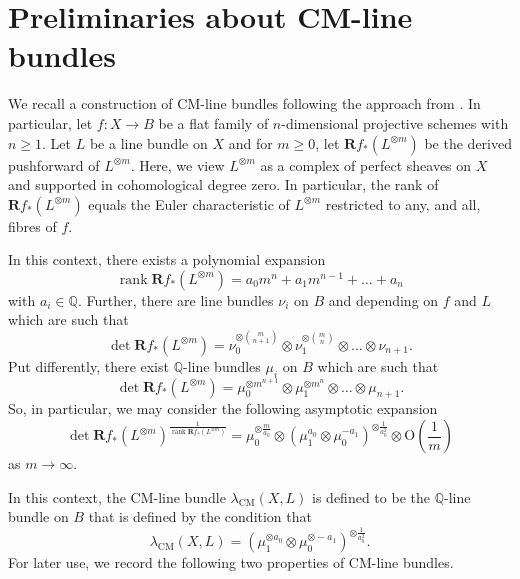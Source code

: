 \documentclass[12pt]{amsart}
\providecommand{\binom}[2]{{#1\choose#2}}
\renewcommand{\geq}{\geqslant}
\newcommand{\QQ}{\mathbb{Q}} %
\theoremstyle{definition}
\numberwithin{equation}{section}
\begin{document}
\section{Preliminaries about CM-line bundles}

We recall a construction of CM-line bundles following the approach from \cite{Arezzo:DellaVedova:LaNave}.  In particular, let $f \colon X \rightarrow B$ be a flat family of $n$-dimensional projective schemes with $n \geq 1$.  Let $L$ be a line bundle on $X$ and for $m \geq 0$, let $\mathbf{R}f_*(L^{\otimes m})$ be the derived pushforward of $L^{\otimes m}$.  Here, we view $L^{\otimes m}$ as a complex of perfect sheaves on $X$ and supported in cohomological degree zero.  In particular, the rank of $\mathbf{R}f_*(L^{\otimes m})$ equals the Euler characteristic of $L^{\otimes m}$ restricted to any, and all, fibres of $f$.

In this context, there exists a polynomial expansion
$$
\operatorname{rank} \mathbf{R}f_*(L^{\otimes m}) = a_0 m^n + a_1 m^{n-1} + \dots + a_n
$$
with $a_i \in \QQ$.  Further, there are line bundles $\nu_i$ on $B$ and depending on $f$ and $L$ which are such that 
$$
\operatorname{det} \mathbf{R}f_*(L^{\otimes m}) = \nu_0^{\otimes \binom{m}{n+1} } \otimes \nu_1^{\otimes \binom{m}{n}} \otimes \dots \otimes \nu_{n+1} \text{.}
$$
Put differently, there exist $\QQ$-line bundles $\mu_i$ on $B$ which are such that 
$$
\operatorname{det} \mathbf{R} f_*(L^{\otimes m}) = \mu_0^{\otimes m^{n+1}} \otimes \mu_1^{\otimes m^n} \otimes \dots \otimes \mu_{n+1} \text{.}
$$
So, in particular, we may consider the following asymptotic expansion
$$
\operatorname{det} \mathbf{R}f_* (L^{\otimes m})^{\frac{1}{\operatorname{rank} \mathbf{R} f_*(L^{\otimes m})}} = \mu_0^{\otimes \frac{m}{a_0}} \otimes (\mu_1^{a_0} \otimes \mu_0^{-a_1})^{\otimes \frac{1}{a_0^2}} \otimes \mathrm{O}\left(\frac{1}{m}\right) 
$$
as $m \to \infty$.

In this context, the CM-line bundle $\lambda_{\mathrm{CM}}(X,L)$ is defined to be the $\QQ$-line bundle on $B$ that is defined by the condition that
$$
\lambda_{\mathrm{CM}}(X,L) = \left( \mu_1^{\otimes a_0} \otimes \mu_0^{\otimes -a_1} \right)^{\otimes \frac{1}{a_0^2}} \text{.}
$$
For later use, we record the following two properties of CM-line bundles.
\end{document}
